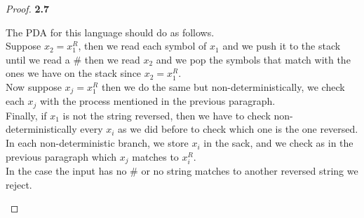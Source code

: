 \documentclass[11pt]{article}
\theoremstyle{definition}
\begin{document}
\begin{proof}{\textbf{2.7}}
\begin{itemize}
    The PDA for this language should do as follows.\\
    Suppose $x_2 = x_1^R$, then we read each symbol of $x_1$ and we push it to
    the stack until we read a $\#$ then we read $x_2$ and we pop the symbols
    that match with the ones we have on the stack since $x_2 = x_1^R$.\\
    Now suppose $x_j = x_1^R$ then we do the same but non-deterministically,
    we check each $x_j$ with the process mentioned in the previous paragraph.\\
    Finally, if $x_1$ is not the string reversed, then we have to check
    non-deterministically every $x_i$ as we did before to check which one is
    the one reversed. In each non-deterministic branch, we store $x_i$ in the
    sack, and we check as in the previous paragraph which $x_j$ matches to
    $x_i^R$.\\
    In the case the input has no $\#$ or no string matches to another reversed
    string we reject.
\end{itemize}
\end{proof}
\cleardoublepage
\end{document}
